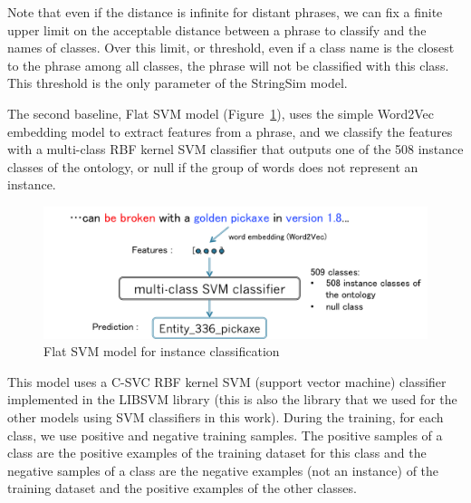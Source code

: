 \documentclass[twocolumn]{article}
\begin{document}
Note that even if the distance is infinite for distant phrases, we can fix a finite upper limit on the acceptable distance between a phrase to classify and the names of classes. Over this limit, or threshold, even if a class name is the closest to the phrase among all classes, the phrase will not be classified with this class. This threshold is the only parameter of the StringSim model.

The second baseline, Flat SVM model (Figure~\ref{flatSVMModel}), uses the simple Word2Vec embedding model to extract features from a phrase, and we classify the features with a multi-class RBF kernel SVM classifier that outputs one of the 508 instance classes of the ontology, or null if the group of words does not represent an instance.

\begin{figure}[t]
   \centering \includegraphics[width=\linewidth]{Figures/Semantic_Parsing/flatSVMModel.png}
   \caption{\label{flatSVMModel} Flat SVM model for instance classification}
\end{figure}

This model uses a C-SVC RBF kernel SVM (support vector machine) classifier implemented in the LIBSVM library \cite{chang2011libsvm} (this is also the library that we used for the other models using SVM classifiers in this work). During the training, for each class, we use positive and negative training samples. The positive samples of a class are the positive examples of the training dataset for this class and the negative samples of a class are the negative examples (not an instance) of the training dataset and the positive examples of the other classes.
\end{document}
